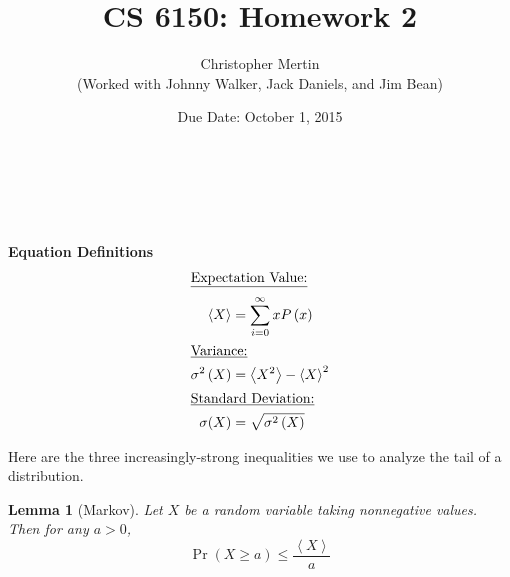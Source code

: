 \documentclass[addpoints]{exam}
\author{Christopher Mertin\\{\small (Worked with Johnny Walker, Jack Daniels, and Jim Bean)}}
\title{CS 6150: Homework 2}
\date{Due Date: October 1, 2015}
\newcommand{\Exval}[1]{\left< #1\right>}
\newcommand{\ExvalDef}[1]{\sum_{i=0}^{\infty} #1P\left( #1\right)}
\newcommand{\Var}[1]{\sigma^{2}\left( #1\right)}
\newcommand{\VarDef}[1]{\left< #1^{2}\right> - \left< #1\right>^{2}}
\newtheorem{lemma}{Lemma}[section]
\begin{document}
\maketitle
\begin{center}
\end{center}

\pointname{}
\bonuspointname{}
\pointformat{[\bfseries\thepoints]}

\printanswers

\begin{center}
  \gradetable
\end{center}
  \ \\\ \\\ \\{\bf \large Equation Definitions}
  \begin{align*}
    \intertext{\underline{Expectation Value:}}
    \Exval{X} &= \ExvalDef{x}\\
    \intertext{\underline{Variance:}}
    \Var{X} &= \VarDef{X}\\
    \intertext{\underline{Standard Deviation:}}
    \sigma (X) &= \sqrt{\Var{X}}
  \end{align*}
\newpage

Here are the three increasingly-strong inequalities we use to analyze the tail
of a distribution. 

\begin{lemma}[Markov]
  Let $X$ be a random variable taking nonnegative values. Then for any $a > 0$,
\[ \Pr(X \ge a) \le \frac{\Exval{X}}{a} \]
\end{lemma}
\end{document}
